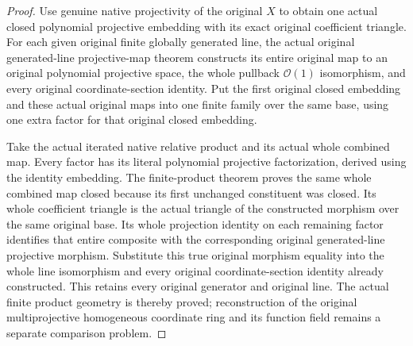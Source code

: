 \begin{proof}
Use genuine native projectivity of the original $X$ to obtain one
actual closed polynomial projective embedding with its exact
original coefficient triangle. For each given original finite
globally generated line, the actual original generated-line
projective-map theorem constructs its entire original map to an
original polynomial projective space, the whole pullback
$\mathcal O(1)$ isomorphism, and every original coordinate-section
identity. Put the first original closed embedding and these
actual original maps into one finite family over the same base,
using one extra factor for that original closed embedding.

Take the actual iterated native relative product and its actual
whole combined map. Every factor has its literal polynomial
projective factorization, derived using the identity embedding.
The finite-product theorem proves the same whole combined map
closed because its first unchanged constituent was closed. Its
whole coefficient triangle is the actual triangle of the
constructed morphism over the same original base. Its whole
projection identity on each remaining factor identifies that
entire composite with the corresponding original generated-line
projective morphism. Substitute this true original morphism
equality into the whole line isomorphism and every original
coordinate-section identity already constructed. This retains
every original generator and original line. The actual finite
product geometry is thereby proved; reconstruction of the
original multiprojective homogeneous coordinate ring and its
function field remains a separate comparison problem.
\end{proof}
